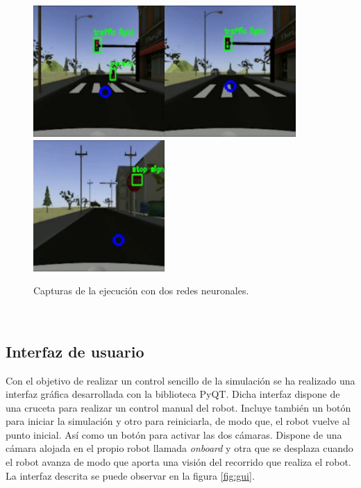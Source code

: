 \begin{figure} [h!]
	\begin{center}
		\includegraphics[width=5cm]{figs/simRed}\hspace{0.1cm}\includegraphics[width=5cm]{figs/simGreen}\hspace{0.1cm}\includegraphics[width=5cm]{figs/simStop}
	\end{center}
	\caption{Capturas de la ejecución con dos redes neuronales.}
	\label{fig:simexecution}
\end{figure}\

\subsection{Interfaz de usuario}
\label{subsection:interface}
Con el objetivo de realizar un control sencillo de la simulación se ha realizado una interfaz gráfica desarrollada con la biblioteca PyQT. Dicha interfaz dispone de una cruceta para realizar un control manual del robot. Incluye también un botón para iniciar la simulación y otro para reiniciarla, de modo que, el robot vuelve al punto inicial. Así como un botón para activar las dos cámaras. Dispone de una cámara alojada en el propio robot llamada \textit{onboard} y otra que se desplaza cuando el robot avanza de modo que aporta una visión del recorrido que realiza el robot. La interfaz descrita se puede observar en la figura \ref{fig:gui}.\\ 

